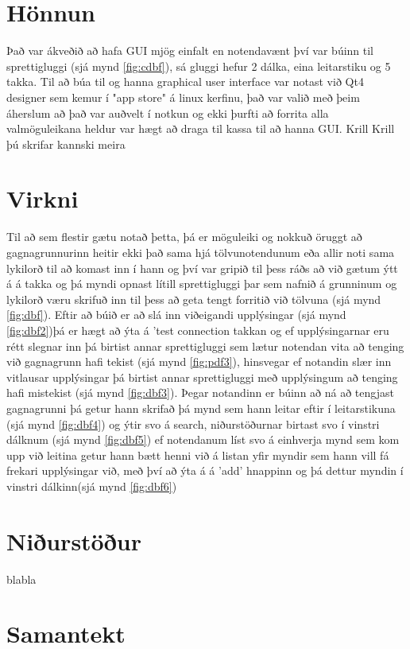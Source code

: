\documentclass[12pt, git, final]{rureport}
\begin{document}
\section{Hönnun}
Það var ákveðið að hafa GUI mjög einfalt en notendavænt því var búinn til sprettigluggi (sjá mynd \ref{fig:cdbf}), sá gluggi hefur 2 dálka, eina leitarstiku og 5 takka. Til að búa til og hanna graphical user interface var notast við Qt4 designer sem kemur í "app store" á linux kerfinu, það var valið með þeim áherslum að það var auðvelt í notkun og ekki þurfti að forrita alla valmöguleikana heldur var hægt að draga til kassa til að hanna GUI. Krill Krill þú skrifar kannski meira 
\section{Virkni}
Til að sem flestir gætu notað þetta, þá er möguleiki og nokkuð öruggt að gagnagrunnurinn heitir ekki það sama hjá tölvunotendunum eða allir noti sama lykilorð til að komast inn í hann og því var gripið til þess ráðs að við gætum ýtt á á takka og þá myndi opnast lítill sprettigluggi þar sem nafnið á grunninum og lykilorð væru skrifuð inn til þess að geta tengt forritið við tölvuna (sjá mynd \ref{fig:dbf}).
Eftir að búið er að slá inn viðeigandi upplýsingar (sjá mynd \ref{fig:dbf2})þá er hægt að ýta á 'test connection takkan og ef upplýsingarnar eru rétt slegnar inn þá birtist annar sprettigluggi sem lætur notendan vita að tenging við gagnagrunn hafi tekist (sjá mynd \ref{fig:pdf3}), hinsvegar ef notandin slær inn vitlausar upplýsingar þá birtist annar sprettigluggi með upplýsingum að tenging hafi mistekist (sjá mynd \ref {fig:dbf3}).
\newline
\newline
Þegar notandinn er búinn að ná að tengjast gagnagrunni þá getur hann skrifað þá mynd sem hann leitar eftir í leitarstikuna (sjá mynd \ref{fig:dbf4}) og ýtir svo á search, niðurstöðurnar birtast svo í vinstri dálknum (sjá mynd \ref{fig:dbf5}) ef notendanum líst svo á einhverja mynd sem kom upp við leitina  getur hann bætt henni við á listan yfir myndir sem hann vill fá frekari upplýsingar við, með því að ýta á á 'add' hnappinn og þá dettur myndin í vinstri dálkinn(sjá mynd \ref{fig:dbf6})

\section{Niðurstöður}\label{nidurstodur}
blabla


\section{Samantekt}
\end{document}
